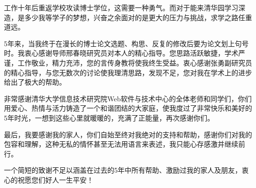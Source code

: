 
\begin{ack}
  工作十年后重返学校攻读博士学位，这需要一种勇气。而对于能来清华园学习深造，是多少我等学子的梦想，兴奋之余面对的是更大的压力与挑战，求学之路任重道远。
  
  5年来，当我终于在漫长的博士论文选题、构思、反复的修改后要为论文划上句号时。我衷心感谢导师邢春晓研究员对本人的精心指导。您思路活跃敏捷，学术严谨，工作敬业，精力充沛，您的言传身教将使我终生受益。衷心感谢张勇副研究员的精心指导，与您无数次的讨论使我理清思路，发现不足，您对我在学术上的进步给出了极大的帮助。
  
  非常感谢清华大学信息技术研究院Web软件与技术中心的全体老师和同学们，你们用爱心、热情与活力铸造了一个和谐团结的大家庭，使我度过了非常快乐和美好的5年时光，一想到这些心里就暖暖的，充满了正能量，再次感谢你们。
  
  最后，我要感谢我的家人，你们自始至终对我绝对的支持和帮助，感谢你们对我的包容和理解，这种无私的情怀甚至无法用语言来表述，我只能心存感激并继续前行。

  一个简短的致谢不足以涵盖在过去的5年中所有帮助、激励过我的家人及朋友，衷心的祝愿您们好人一生平安！
\end{ack}
